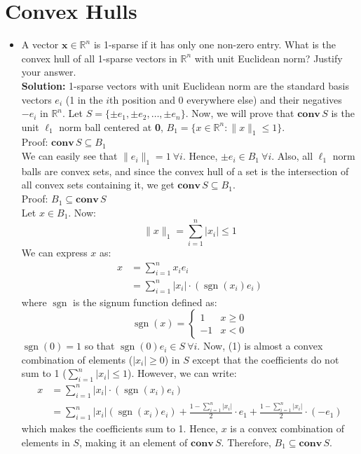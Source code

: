 \documentclass{article}
\newcommand{\mathbi}[1]{\boldsymbol{#1}}
\DeclareMathOperator{\sgn}{sgn}
\begin{document}
\section{Convex Hulls}

\begin{itemize}
  \item[(a)] A vector $\mathbi{x} \in \mathbb{R}^n$ is 1-sparse if it has only one non-zero entry. What is the convex hull of all 1-sparse vectors in $\mathbb{R}^n$ with unit Euclidean norm? Justify your answer. \\
  
  \textbf{Solution:} 1-sparse vectors with unit Euclidean norm are the standard basis vectors $e_i$ (1 in the $i$th position and 0 everywhere else) and their negatives $-e_i$ in $\mathbb{R}^n$. Let $S = \{\pm e_1, \pm e_2, \dots, \pm e_n\}$. Now, we will prove that $\mathbf{conv} \, S$ is the unit $\ell_1$ norm ball centered at \textbf{0}, $B_1 = \{x \in \mathbb{R}^n : \|x\|_1 \le 1\}$. \\

  Proof: $\mathbf{conv} \, S \subseteq B_1$ \\
  We can easily see that $\|e_i\|_1 = 1 ~ \forall i$. Hence, $\pm e_i \in B_1 ~ \forall i$. Also, all $\ell_1$ norm balls are convex sets, and since the convex hull of a set is the intersection of all convex sets containing it, we get $\mathbf{conv} \, S \subseteq B_1$. \\

  Proof: $B_1 \subseteq \mathbf{conv} \, S$ \\
  Let $x \in B_1$. Now:
  \[ \|x\|_1 = \sum_{i=1}^n |x_i| \le 1 \]
  We can express $x$ as:
  \begin{align*}
    x &= \sum_{i=1}^n x_i e_i \\
    &= \sum_{i=1}^n |x_i| \cdot (\sgn(x_i) e_i) \tag{1}
  \end{align*}
  where $\sgn$ is the signum function defined as:
  \[ \sgn(x) = \begin{cases}
    1 & x \ge 0 \\
    -1 & x < 0
  \end{cases} \]
  $\sgn(0) = 1$ so that $\sgn(0) e_i \in S ~ \forall i$. Now, (1) is almost a convex combination of elements ($|x_i| \ge 0$) in $S$ except that the coefficients do not sum to 1 ($\sum_{i=1}^n |x_i| \le 1$). However, we can write:
  \begin{align*}
    x &= \sum_{i=1}^n |x_i| \cdot (\sgn(x_i) e_i) \\
    &= \sum_{i=1}^n |x_i| (\sgn(x_i) e_i) + \frac{1 - \sum_{i=1}^n |x_i|}{2} \cdot e_1 + \frac{1 - \sum_{i=1}^n |x_i|}{2} \cdot (-e_1)
  \end{align*}
  which makes the coefficients sum to 1. Hence, $x$ is a convex combination of elements in $S$, making it an element of $\mathbf{conv} \, S$. Therefore, $B_1 \subseteq \mathbf{conv} \, S$. \\


\end{itemize}
\end{document}
